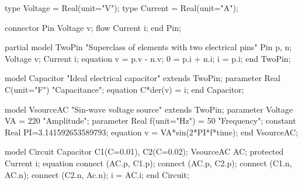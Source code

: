 \begin{boxedverbatim}
type Voltage = Real(unit="V");
type Current = Real(unit="A");

connector Pin
  Voltage      v;
  flow Current i;
end Pin;

partial model TwoPin "Superclass of elements with two electrical pins"
  Pin p, n;
  Voltage v;
  Current i;
equation
  v = p.v - n.v;
  0 = p.i + n.i;
  i = p.i;
end TwoPin;

model Capacitor "Ideal electrical capacitor"
  extends TwoPin;
  parameter Real C(unit="F") "Capacitance";
equation
  C*der(v) = i;
end Capacitor;

model VsourceAC "Sin-wave voltage source"
  extends TwoPin;
  parameter Voltage VA = 220 "Amplitude";
  parameter Real f(unit="Hz") = 50  "Frequency";
  constant  Real PI=3.141592653589793;
equation
  v = VA*sin(2*PI*f*time);
end VsourceAC;

model Circuit
  Capacitor  C1(C=0.01), C2(C=0.02);
  VsourceAC AC;
protected
  Current i;
equation
  connect (AC.p, C1.p);
  connect (AC.p, C2.p);
  connect (C1.n, AC.n);
  connect (C2.n, Ac.n);
  i = AC.i;
end Circuit;
\end{boxedverbatim}
